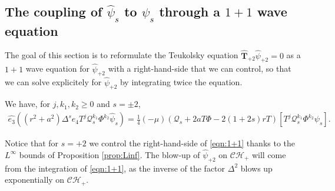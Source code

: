 \documentclass[reqno]{amsart}
\numberwithin{equation}{section}
\newcommand{\teukhat}{\widehat{\teuk}}
\newcommand{\mcq}{\mathcal{Q}}
\newcommand{\ch}{\mathcal{CH_+}}
\newcommand{\teuk}{\mathbf{T}}
\newcommand{\psihat}{\widehat{\psi}}
\newcommand{\ethat}{\widehat{e_3}}
\newcommand{\psihatp}{\psihat_{+2}}
\newcommand{\fraks}{2}
\theoremstyle{plain}
\theoremstyle{definition}
\theoremstyle{remark}
\numberwithin{equation}{section}
\begin{document}
\subsection{The coupling of $\psihat_s$ to $\psi_s$ through a $1+1$ wave equation}
The goal of this section is to reformulate the Teukolsky equation $\teukhat_{+2}\psihatp=0$ as a $1+1$ wave equation for $\psihatp$ with a right-hand-side that we can control, so that we can solve explicitely for $\psihatp$ by integrating twice the equation.
\begin{prop}\label{prop:1+1}
    We have, for $j,k_1,k_2\geq 0$ and $s=\pm 2$,
\begin{align}\label{eqn:1+1}
    \ethat((r^2+a^2)\Delta^s e_4T^j\mcq_s^{k_1}\Phi^{k_2}\psihat_s)=\frac{1}{4}(-\mu)\left(\mcq_{s}+2aT\Phi-2(1+2s)rT\right)[T^j\mcq_s^{k_1}\Phi^{k_2}\psi_s].
\end{align}
\end{prop}
\begin{rem}
    Notice that for $s=+2$ we control the right-hand-side of \eqref{eqn:1+1} thanks to the $L^\infty$ bounds of Proposition \ref{prop:Linf}. The blow-up of $\psihatp$ on $\ch$ will come from the integration of \eqref{eqn:1+1}, as the inverse of the factor $\Delta^\fraks$ blows up exponentially on $\ch$.
\end{rem}
\end{document}
